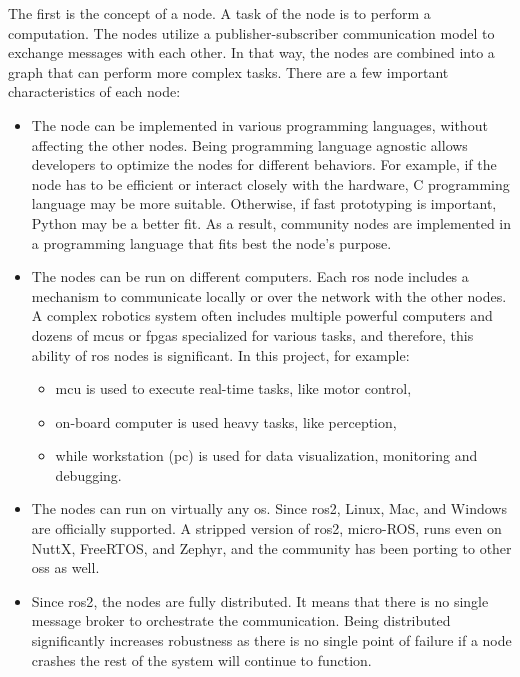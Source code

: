 The first is the concept of a node.
A task of the node is to perform a computation.
The nodes utilize a publisher-subscriber communication model to exchange messages with each other. 
In that way, the nodes are combined into a graph that can perform more complex tasks.
There are a few important characteristics of each node:
\begin{itemize}
    \item The node can be implemented in various programming languages, without affecting the other nodes.
    Being programming language agnostic allows developers to optimize the nodes for different behaviors.
    For example, if the node has to be efficient or interact closely with the hardware, C programming language may be more suitable.
    Otherwise, if fast prototyping is important,  Python may be a better fit.
    As a result, community nodes are implemented in a programming language that fits best the node's purpose.
    \item The nodes can be run on different computers.
    Each \ac{ros} node includes a mechanism to communicate locally or over the network with the other nodes.
    A complex robotics system often includes multiple powerful computers and dozens of \acp{mcu} or \acp{fpga} specialized for various tasks, and therefore, this ability of \ac{ros} nodes is significant.
    In this project, for example:
    \begin{itemize}
        \item \ac{mcu} is used to execute real-time tasks, like motor control,
        \item on-board computer is used heavy tasks, like perception,
        \item while workstation (\acs{pc}) is used for data visualization, monitoring and debugging.
    \end{itemize}
    \item The nodes can run on virtually any \ac{os}.
    Since \ac{ros2}, Linux, Mac, and Windows are officially supported.
    A stripped version of \ac{ros2}, micro-ROS, runs even on NuttX, FreeRTOS, and Zephyr, and the community has been porting to other \acp{os} as well.
    \item Since \ac{ros2}, the nodes are fully distributed. 
    It means that there is no single message broker to orchestrate the communication.
    Being distributed significantly increases robustness as there is no single point of failure if a node crashes the rest of the system will continue to function.
\end{itemize}

